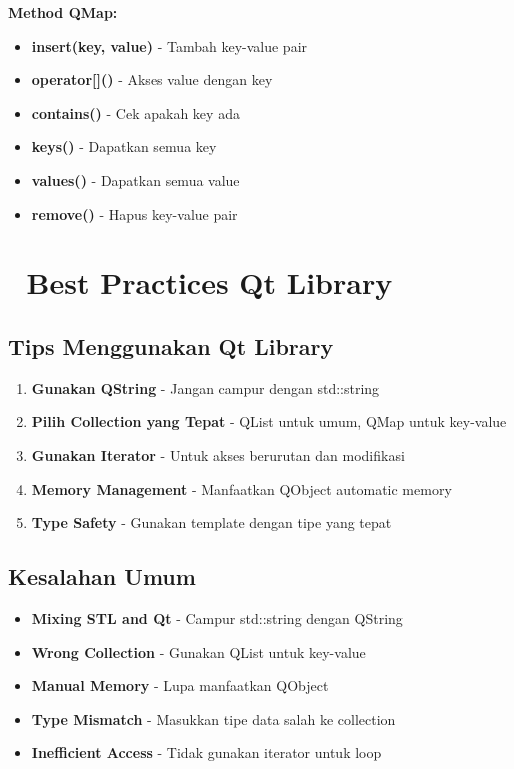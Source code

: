 \textbf{Method QMap:}
\begin{itemize}
\item \textbf{insert(key, value)} - Tambah key-value pair
\item \textbf{operator[]()} - Akses value dengan key
\item \textbf{contains()} - Cek apakah key ada
\item \textbf{keys()} - Dapatkan semua key
\item \textbf{values()} - Dapatkan semua value
\item \textbf{remove()} - Hapus key-value pair
\end{itemize}

\section{🔧 Best Practices Qt Library}

\subsection{Tips Menggunakan Qt Library}

\begin{enumerate}
\item \textbf{Gunakan QString} - Jangan campur dengan std::string
\item \textbf{Pilih Collection yang Tepat} - QList untuk umum, QMap untuk key-value
\item \textbf{Gunakan Iterator} - Untuk akses berurutan dan modifikasi
\item \textbf{Memory Management} - Manfaatkan QObject automatic memory
\item \textbf{Type Safety} - Gunakan template dengan tipe yang tepat
\end{enumerate}

\subsection{Kesalahan Umum}

\begin{itemize}
\item \textbf{Mixing STL and Qt} - Campur std::string dengan QString
\item \textbf{Wrong Collection} - Gunakan QList untuk key-value
\item \textbf{Manual Memory} - Lupa manfaatkan QObject
\item \textbf{Type Mismatch} - Masukkan tipe data salah ke collection
\item \textbf{Inefficient Access} - Tidak gunakan iterator untuk loop
\end{itemize}

